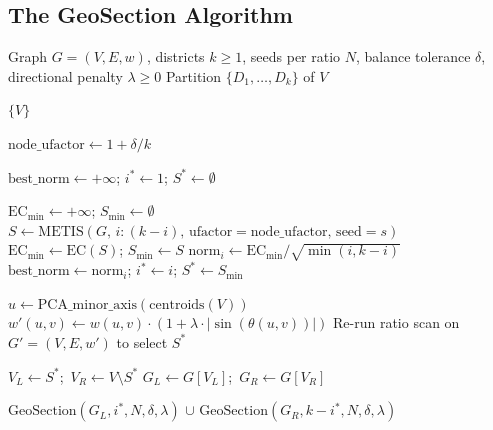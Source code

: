 \subsection{The GeoSection Algorithm}
\label{sec:geosection-alg}

\begin{algorithm}[H]
\caption{GeoSection($G$, $k$, $N$, $\delta$, $\lambda$)}
\label{alg:geosection}
\begin{algorithmic}[1]
\Require Graph $G = (V, E, w)$, districts $k \geq 1$, seeds per ratio $N$,
  balance tolerance $\delta$, directional penalty $\lambda \geq 0$
\Ensure Partition $\{D_1, \ldots, D_k\}$ of $V$

 \Return $\{V\}$ \EndIf

\State $\mathrm{node\_ufactor} \gets 1 + \delta / k$
\hfill{}

\State{}
\State $\mathrm{best\_norm} \gets +\infty$;
   $i^* \gets 1$; $S^* \gets \emptyset$

  \State $\mathrm{EC}_{\min} \gets +\infty$; $S_{\min} \gets \emptyset$
    \State $S \gets \mathrm{METIS}(G,\, i:(k-i),\, \mathrm{ufactor}=\mathrm{node\_ufactor},\, \mathrm{seed}=s)$
      $\mathrm{EC}_{\min} \gets \mathrm{EC}(S)$; $S_{\min} \gets S$
    \EndIf
  \EndFor
  \State $\mathrm{norm}_i \gets \mathrm{EC}_{\min} / \sqrt{\min(i, k-i)}$
    $\mathrm{best\_norm} \gets \mathrm{norm}_i$; $i^* \gets i$; $S^* \gets S_{\min}$
  \EndIf
\EndFor

\State{}
  \State $\hat{u} \gets \mathrm{PCA\_minor\_axis}(\mathrm{centroids}(V))$
  \hfill{}
  \State $w'(u,v) \gets w(u,v) \cdot (1 + \lambda \cdot |\!\sin(\theta(u,v))|)$
  \hfill{}
  \State Re-run ratio scan on $G' = (V, E, w')$ to select $S^*$
\EndIf

\State{}
\State $V_L \gets S^*$;\ $V_R \gets V \setminus S^*$
\State $G_L \gets G[V_L]$;\ $G_R \gets G[V_R]$
\hfill{}

\State \Return $\mathrm{GeoSection}(G_L, i^*, N, \delta, \lambda)$
         $\cup$ $\mathrm{GeoSection}(G_R, k - i^*, N, \delta, \lambda)$
\end{algorithmic}
\end{algorithm}


